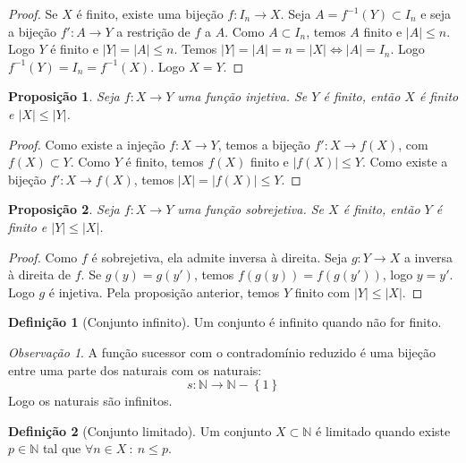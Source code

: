 \documentclass{article}
\theoremstyle{plain}
\newtheorem{prop}{Proposição}[section]
\theoremstyle{definition}
\newtheorem{definicao}{Definição}[section]
\theoremstyle{remark}
\newtheorem{obs}{Observação}[section]
\begin{document}
\begin{proof}
	Se $X$ é finito, existe uma bijeção $f : I_n \to X$. Seja $A = f^{-1}(Y) \subset I_n$ e seja a bijeção $f': A \to Y$ a restrição de $f$ a $A$.  Como $A\subset I_n$, temos $A$ finito e $|A| \leq n$. Logo $Y$ é finito e  $|Y| = |A| \leq n$.  Temos $|Y| = |A| = n  = |X| \iff |A| = I_n$. Logo $f^{-1}(Y) = I_n = f^{-1}(X)$. Logo $X = Y$.
\end{proof}
\begin{prop}
	Seja $f:X\to Y$ uma função injetiva. Se $Y$ é finito, então $X$ é finito e $|X|\leq |Y|$.
\end{prop}
\begin{proof}
	Como existe a injeção $f: X\to Y$, temos a bijeção $f': X \to f(X)$,  com $f(X)\subset Y$. Como $Y$ é finito, temos $f(X)$ finito e  $|f(X)| \leq Y$. Como existe a bijeção $f':X\to f(X)$, temos $|X| = |f(X)| \leq Y$.
\end{proof}
\begin{prop}
	Seja $f:X\to Y$ uma função sobrejetiva. Se $X$ é finito, então $Y$ é finito e $|Y|\leq |X|$.
\end{prop}
\begin{proof}
	Como $f$ é sobrejetiva, ela admite inversa à direita. Seja $g: Y\to X$ a inversa à direita de $f$.  Se $g(y) = g(y')$, temos $f(g(y)) = f(g(y'))$, logo $y = y'$. Logo $g$ é injetiva. Pela proposição anterior, temos $Y$ finito com $|Y| \leq |X|$. 
\end{proof}
\begin{definicao}[Conjunto infinito]
	Um conjunto é infinito quando não for finito.
\end{definicao}
\begin{obs}
	A função sucessor com o contradomínio reduzido é uma bijeção entre uma parte dos naturais com os naturais:
	$$s: \mathbb{N} \to \mathbb{N} - \left\{1\right\}$$
	Logo os naturais são infinitos.
\end{obs}
\begin{definicao}[Conjunto limitado]
	Um conjunto $X\subset \mathbb{N}$ é limitado quando existe $p\in \mathbb{N}$ tal que $\forall n\in X \: : \: n \leq p$.
\end{definicao}

%
\end{document}
